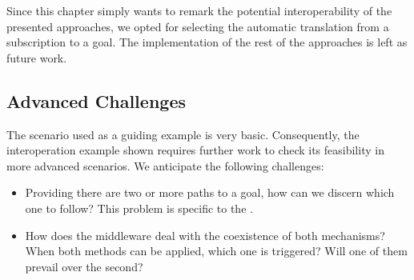 Since this chapter simply wants to remark the potential interoperability of the presented approaches,
we opted for selecting the automatic translation from a subscription to a goal.
The implementation of the rest of the approaches is left as future work.



\subsection{Advanced Challenges} %

The scenario used as a guiding example is very basic.
Consequently, the interoperation example shown requires further work to check its feasibility in more advanced scenarios.
We anticipate the following challenges:
\begin{itemize}
  \item Providing there are two or more paths to a goal, how can we discern which one to follow?
	This problem is specific to the \restActuation{}.
  \item How does the middleware deal with the coexistence of both mechanisms?
	When both methods can be applied, which one is triggered?
	Will one of them prevail over the second?
\end{itemize}